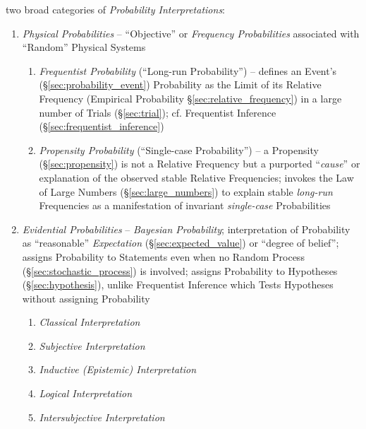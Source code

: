 two broad categories of \emph{Probability Interpretations}:
\begin{enumerate}
  \item \emph{Physical Probabilities} -- ``Objective'' or \emph{Frequency
    Probabilities} associated with ``Random'' Physical Systems
    \begin{enumerate}
      \item \emph{Frequentist Probability} (``Long-run Probability'') -- defines
        an Event's (\S\ref{sec:probability_event}) Probability as the Limit of
        its Relative Frequency (Empirical Probability
        \S\ref{sec:relative_frequency}) in a large number of Trials
        (\S\ref{sec:trial}); cf. Frequentist Inference
        (\S\ref{sec:frequentist_inference})
      \item \emph{Propensity Probability} (``Single-case Probability'') -- a
        Propensity (\S\ref{sec:propensity}) is not a Relative Frequency but a
        purported ``\emph{cause}'' or explanation of the observed stable
        Relative Frequencies; invokes the Law of Large Numbers
        (\S\ref{sec:large_numbers}) to explain stable \emph{long-run}
        Frequencies as a manifestation of invariant \emph{single-case}
        Probabilities
    \end{enumerate}
  \item \emph{Evidential Probabilities} -- \emph{Bayesian Probability};
    interpretation of Probability as ``reasonable'' \emph{Expectation}
    (\S\ref{sec:expected_value}) or ``degree of belief''; assigns Probability to
    Statements even when no Random Process (\S\ref{sec:stochastic_process}) is
    involved; assigns Probability to Hypotheses (\S\ref{sec:hypothesis}), unlike
    Frequentist Inference which Tests Hypotheses without assigning Probability
    \begin{enumerate}
      \item \emph{Classical Interpretation}
      \item \emph{Subjective Interpretation}
      \item \emph{Inductive (Epistemic) Interpretation}
      \item \emph{Logical Interpretation}
      \item \emph{Intersubjective Interpretation}
    \end{enumerate}
\end{enumerate}

